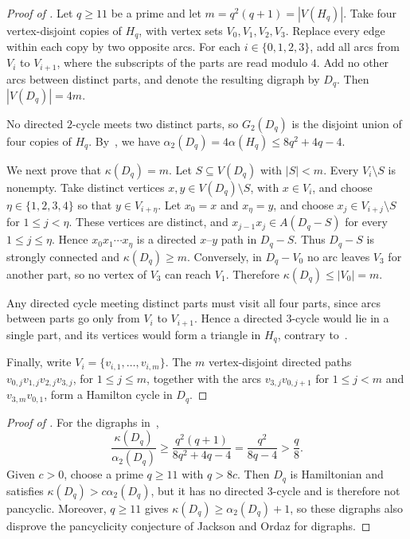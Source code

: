 \documentclass[11pt,a4paper]{article}
\theoremstyle{remark}
\numberwithin{equation}{section}
\newcommand{\al}{\alpha_2}
\begin{document}
\begin{proof}[Proof of ]
	Let $q\ge11$ be a prime and let $m=q^2(q+1)=|V(H_q)|$.
	Take four vertex-disjoint copies of $H_q$, with vertex sets
	$V_0,V_1,V_2,V_3$.
	Replace every edge within each copy by two opposite arcs.
	For each $i\in\{0,1,2,3\}$, add all arcs from $V_i$ to
	$V_{i+1}$, where the subscripts of the parts are read modulo $4$.
	Add no other arcs between distinct parts, and denote the
	resulting digraph by $D_q$.
	Then $|V(D_q)|=4m$.
	
	No directed $2$-cycle meets two distinct parts, so $G_2(D_q)$
	is the disjoint union of four copies of $H_q$.
	By~, we have
	$\al(D_q)=4\alpha(H_q)\le8q^2+4q-4$.
	
	We next prove that $\kappa(D_q)=m$.
	Let $S\subseteq V(D_q)$ with $|S|<m$.
	Every $V_i\setminus S$ is nonempty.
	Take distinct vertices $x,y\in V(D_q)\setminus S$, with
	$x\in V_i$, and choose $\eta \in\{1,2,3,4\}$ so that
	$y\in V_{i+\eta }$.
	Let $x_0=x$ and $x_{\eta}=y$, and choose
	$x_j\in V_{i+j}\setminus S$ for $1\le j<\eta $.
	These vertices are distinct, and
	$x_{j-1}x_j\in A(D_q-S)$ for every $1\le j\le \eta $.
	Hence $x_0x_1\cdots x_{\eta}$ is a directed $x$--$y$ path in
	$D_q-S$.
	Thus $D_q-S$ is strongly connected and $\kappa(D_q)\ge m$.
	Conversely, in $D_q-V_0$ no arc leaves $V_3$ for another part,
	so no vertex of $V_3$ can reach $V_1$.
	Therefore $\kappa(D_q)\le |V_0|=m$.
	
	Any directed cycle meeting distinct parts must visit all four
	parts, since arcs between parts go only from $V_i$ to $V_{i+1}$.
	Hence a directed $3$-cycle would lie in a single part, and its
	vertices would form a triangle in $H_q$, contrary
	to~.
	
	Finally, write $V_i=\{v_{i,1},\ldots,v_{i,m}\}$.
	The $m$ vertex-disjoint directed paths
	$v_{0,j}v_{1,j}v_{2,j}v_{3,j}$, for $1\le j\le m$, together
	with the arcs $v_{3,j}v_{0,j+1}$ for $1\le j<m$ and
	$v_{3,m}v_{0,1}$, form a Hamilton cycle in $D_q$.
\end{proof}

\begin{proof}[Proof of ]
	For the digraphs in~,
	\[
	\frac{\kappa(D_q)}{\al(D_q)}
	\ge \frac{q^2(q+1)}{8q^2+4q-4}
	=\frac{q^2}{8q-4}
	>\frac q8.
	\]
	Given $c>0$, choose a prime $q\ge11$ with $q>8c$.
	Then $D_q$ is Hamiltonian and satisfies
	$\kappa(D_q)>c\al(D_q)$, but it has no directed $3$-cycle
	and is therefore not pancyclic.
	Moreover, $q\ge11$ gives $\kappa(D_q)\ge\al(D_q)+1$,
	so these digraphs also disprove the pancyclicity conjecture
	of Jackson and Ordaz for digraphs.
\end{proof}
\end{document}
